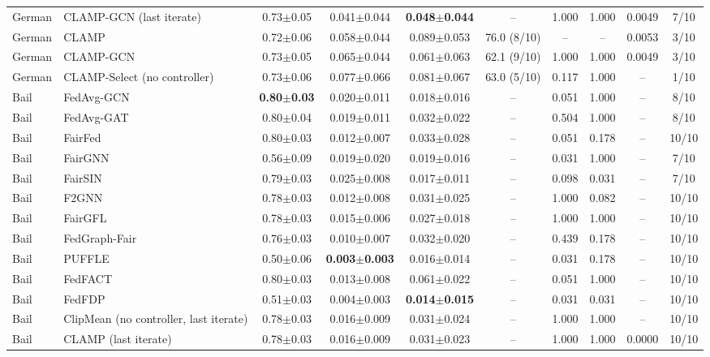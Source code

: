 \begin{table}[tbp]
{\begin{tabular}{llcccccccc}
German & CLAMP-GCN (last iterate) & 0.73$\pm$0.05 & 0.041$\pm$0.044 & \textbf{0.048$\pm$0.044} & -- & 1.000 & 1.000 & 0.0049 & 7/10 \\
German & CLAMP & 0.72$\pm$0.06 & 0.058$\pm$0.044 & 0.089$\pm$0.053 & 76.0 (8/10) & -- & -- & 0.0053 & 3/10 \\
German & CLAMP-GCN & 0.73$\pm$0.05 & 0.065$\pm$0.044 & 0.061$\pm$0.063 & 62.1 (9/10) & 1.000 & 1.000 & 0.0049 & 3/10 \\
German & CLAMP-Select (no controller) & 0.73$\pm$0.06 & 0.077$\pm$0.066 & 0.081$\pm$0.067 & 63.0 (5/10) & 0.117 & 1.000 & -- & 1/10 \\
Bail & FedAvg-GCN & \textbf{0.80$\pm$0.03} & 0.020$\pm$0.011 & 0.018$\pm$0.016 & -- & 0.051 & 1.000 & -- & 8/10 \\
Bail & FedAvg-GAT & 0.80$\pm$0.04 & 0.019$\pm$0.011 & 0.032$\pm$0.022 & -- & 0.504 & 1.000 & -- & 8/10 \\
Bail & FairFed & 0.80$\pm$0.03 & 0.012$\pm$0.007 & 0.033$\pm$0.028 & -- & 0.051 & 0.178 & -- & 10/10 \\
Bail & FairGNN & 0.56$\pm$0.09 & 0.019$\pm$0.020 & 0.019$\pm$0.016 & -- & 0.031 & 1.000 & -- & 7/10 \\
Bail & FairSIN & 0.79$\pm$0.03 & 0.025$\pm$0.008 & 0.017$\pm$0.011 & -- & 0.098 & 0.031 & -- & 7/10 \\
Bail & F2GNN & 0.78$\pm$0.03 & 0.012$\pm$0.008 & 0.031$\pm$0.025 & -- & 1.000 & 0.082 & -- & 10/10 \\
Bail & FairGFL & 0.78$\pm$0.03 & 0.015$\pm$0.006 & 0.027$\pm$0.018 & -- & 1.000 & 1.000 & -- & 10/10 \\
Bail & FedGraph-Fair & 0.76$\pm$0.03 & 0.010$\pm$0.007 & 0.032$\pm$0.020 & -- & 0.439 & 0.178 & -- & 10/10 \\
Bail & PUFFLE & 0.50$\pm$0.06 & \textbf{0.003$\pm$0.003} & 0.016$\pm$0.014 & -- & 0.031 & 0.178 & -- & 10/10 \\
Bail & FedFACT & 0.80$\pm$0.03 & 0.013$\pm$0.008 & 0.061$\pm$0.022 & -- & 0.051 & 1.000 & -- & 10/10 \\
Bail & FedFDP & 0.51$\pm$0.03 & 0.004$\pm$0.003 & \textbf{0.014$\pm$0.015} & -- & 0.031 & 0.031 & -- & 10/10 \\
Bail & ClipMean (no controller, last iterate) & 0.78$\pm$0.03 & 0.016$\pm$0.009 & 0.031$\pm$0.024 & -- & 1.000 & 1.000 & -- & 10/10 \\
Bail & CLAMP (last iterate) & 0.78$\pm$0.03 & 0.016$\pm$0.009 & 0.031$\pm$0.023 & -- & 1.000 & 1.000 & 0.0000 & 10/10 \\

\end{tabular}}
\end{table}

